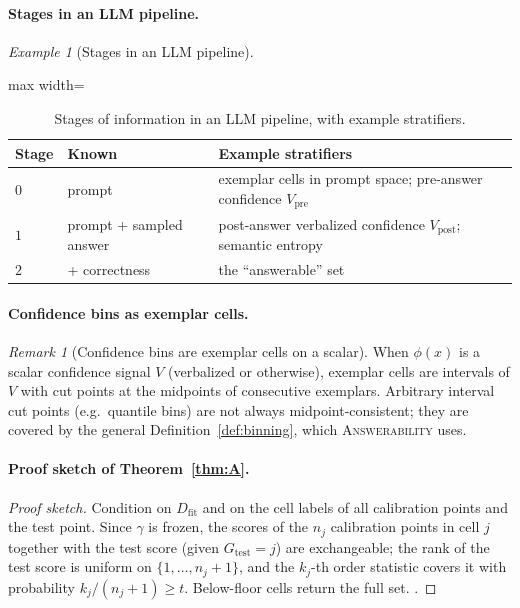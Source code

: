 \documentclass[twoside]{article}
\theoremstyle{definition}
\theoremstyle{remark}
\newtheorem{remark}[theorem]{Remark}
\newtheorem{example}[theorem]{Example}
\newcommand{\Dfit}{D_{\mathrm{fit}}}
\newcommand{\1}{\mathbf{1}}
\newcommand{\expname}[1]{\textsc{#1}}
\begin{document}
\paragraph{Stages in an LLM pipeline.}
\begin{example}[Stages in an LLM pipeline]
\label{ex:stages}
\begin{table}[t]
\caption{Stages of information in an LLM pipeline, with example stratifiers.}
\centering\small
\begin{adjustbox}{max width=\textwidth}
\begin{tabular}{lll}
\toprule
Stage & Known & Example stratifiers\\
\midrule
$0$ & prompt & exemplar cells in prompt space; pre-answer confidence $V_{\mathrm{pre}}$\\
$1$ & prompt + sampled answer & post-answer verbalized confidence $V_{\mathrm{post}}$; semantic entropy\\
$2$ & + correctness & the ``answerable'' set\\
\bottomrule
\end{tabular}
\end{adjustbox}
\end{table}
\end{example}

\paragraph{Confidence bins as exemplar cells.}
\begin{remark}[Confidence bins are exemplar cells on a scalar]
When $\phi(x)$ is a scalar confidence signal $V$ (verbalized or otherwise), exemplar cells
are intervals of $V$ with cut points at the midpoints of consecutive exemplars. Arbitrary
interval cut points (e.g.\ quantile bins) are not always midpoint-consistent; they are
covered by the general Definition~\ref{def:binning}, which \expname{Answerability} uses.
\end{remark}

\paragraph{Proof sketch of Theorem~\ref{thm:A}.}
\begin{proof}[Proof sketch]
Condition on $\Dfit$ and on the cell labels of all calibration points and the test
point. Since $\gamma$ is frozen, the scores of the $n_j$ calibration points in cell $j$
together with the test score (given $G_{\mathrm{test}}=j$) are exchangeable; the rank of the
test score is uniform on $\{1,\dots,n_j+1\}$, and the $k_j$-th order statistic covers it
with probability $k_j/(n_j+1)\ge t$. Below-floor cells return the full set.
\citep{vovk2005algorithmic,vovk2012conditional}.
\end{proof}
\end{document}
